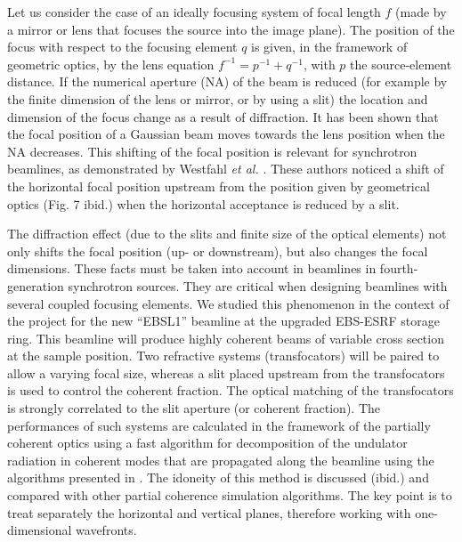 \documentclass{osa-article}
\begin{document}
Let us consider the case of an ideally focusing system of focal length $f$ (made by a mirror or lens that focuses the source into the image plane). The position of the focus with respect to the focusing element $q$ is given, in the framework of geometric optics, by the lens equation $f^{-1}=p^{-1}+q^{-1}$, with $p$ the source-element distance. If the numerical aperture (NA) of the beam is reduced (for example by the finite dimension of the lens or mirror, or by using a slit) the location and dimension of the focus change as a result of diffraction. It has been shown \cite{Tanaka:85} that the focal position of a Gaussian beam moves towards the lens position when the NA decreases. This shifting of the focal position is relevant for synchrotron beamlines, as demonstrated by Westfahl {\it et al.} \cite{westfahl}. These authors noticed a shift of the horizontal focal position upstream from the position given by geometrical optics (Fig. 7 ibid.) when the horizontal acceptance is reduced by a slit. 

The diffraction effect (due to the slits and finite size of the optical elements) not only shifts the focal position (up- or downstream), but also changes the focal dimensions. These facts must be taken into account in beamlines in fourth-generation synchrotron sources. They are critical when designing beamlines with several coupled focusing elements. We studied this phenomenon in the context of the project for the new ``EBSL1'' beamline at the upgraded EBS-ESRF storage ring. This beamline will produce highly coherent beams of variable cross section at the sample position. Two refractive systems (transfocators) will be paired to allow a varying focal size, whereas a slit placed upstream from the transfocators is used to control the coherent fraction. The optical matching of the transfocators is strongly correlated to the slit aperture (or coherent fraction). The performances of such systems are calculated in the framework of the partially coherent optics using a fast algorithm for decomposition of the undulator radiation in coherent modes that are propagated along the beamline using the algorithms presented in \cite{delrio2021pairing}. The idoneity of this method is discussed (ibid.) and compared with other partial coherence simulation algorithms. The key point is to treat separately the horizontal and vertical planes, therefore working with one-dimensional wavefronts.

\end{document}
